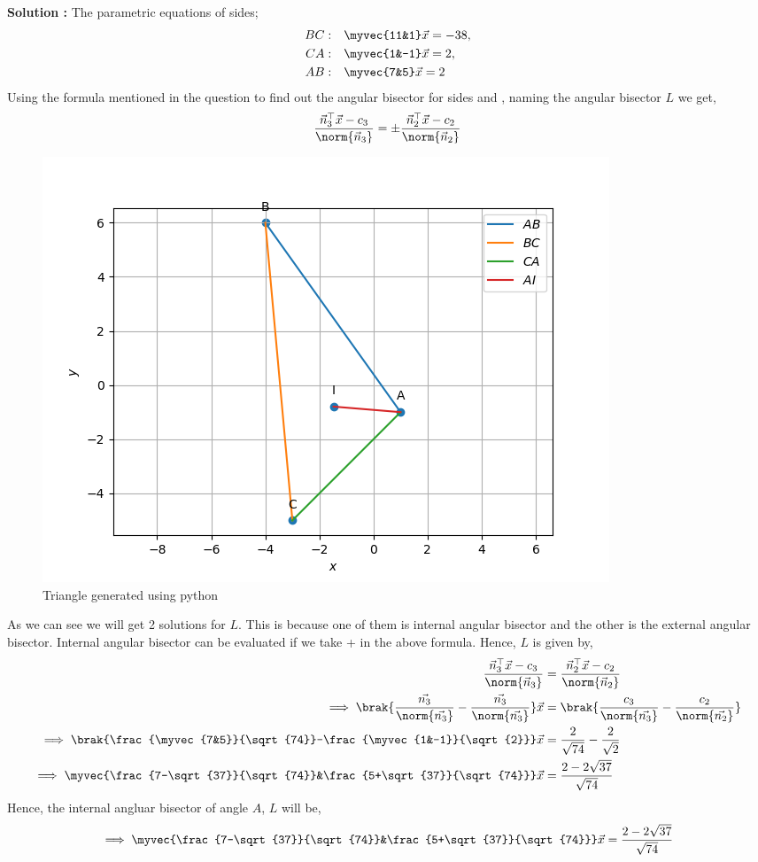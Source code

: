 \textbf{Solution :}
	The parametric equations of sides;
	\begin{align}
	BC:\quad &\myvec{11&1}\vec{x}=-38,\\
	CA:\quad &\myvec{1&-1}\vec{x}=2,\\
	AB:\quad &\myvec{7&5}\vec{x}=2\\	  
	\end{align}
	Using the formula mentioned in the question to find out the angular bisector for sides  and , naming the angular bisector $L$ we get,
	\begin{align}
		\frac{\vec{n}_{3}^{\top} \vec{x}-c_{3}}{\norm{\vec{n}_{3}}}=\pm \frac{\vec{n}_{2}^{\top} \vec{x}-c_{2}}{\norm{\vec{n}_{2}}}
	\end{align}
	\begin{figure}
	\centering
	\includegraphics[width=\columnwidth]{solutions/1/5/1/figs/angular_bisector.png}
	\caption{Triangle generated using python}
	\label{fig:angular_bisector}
	\end{figure}
	As we can see we will get 2 solutions for $L$. This is because one of them is internal angular bisector and the other is the external angular bisector. Internal angular bisector can be evaluated if we take + in the above formula.
	Hence, $L$ is given by,
	\begin{align}
		\frac{\vec{n}_{3}^{\top} \vec{x}-c_{3}}{\norm{\vec{n}_{3}}}&=\frac{\vec{n}_{2}^{\top} \vec{x}-c_{2}}{\norm{\vec{n}_{2}}}\\
		\implies \brak{\frac{\vec{n_{3}}}{\norm{\vec{n_{3}}}}-\frac{\vec{n_{3}}}{\norm{\vec{n_{3}}}}} \vec{x}&=\brak{\frac{c_{3}}{\norm{\vec{n_{3}}}}-\frac{c_{2}}{\norm{\vec{n_{2}}}}}\\
		\implies \brak{\frac{\myvec{7&5}}{\sqrt{74}}-\frac{\myvec{1&-1}}{\sqrt{2}}} \vec{x}&=\frac{2}{\sqrt{74}}-\frac{2}{\sqrt{2}}\\
		\implies \myvec{\frac{7-\sqrt{37}}{\sqrt{74}}&\frac{5+\sqrt{37}}{\sqrt{74}}}\vec{x}&=\frac{2-2\sqrt{37}}{\sqrt{74}}
	\end{align}
	Hence, the internal angluar bisector of angle $A$, $L$ will be,
	\begin{align}
		\implies\myvec{\frac{7-\sqrt{37}}{\sqrt{74}}&\frac{5+\sqrt{37}}{\sqrt{74}}} \vec{x}=\frac{2-2\sqrt{37}}{\sqrt{74}}
		\label{eq:1.5.1}
	\end{align}
	
